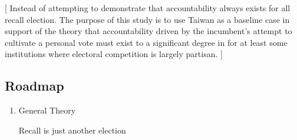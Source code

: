 \documentclass[hyphens, crop=false]{standalone}
\begin{document}
	[
	Instead of attempting to demonstrate that accountability always exists for all recall election.
	The purpose of this study is to use Taiwan as a baseline case in support
	of the theory that accountability driven by the incumbent's attempt to
	cultivate a personal vote must exist to a significant degree
	in for at least some institutions where electoral competition is largely partisan.
	]
	
	
	
	
	\subsection*{Roadmap}
	\begin{enumerate}
		\item 
		General Theory
		
		Recall is just another election
		

\end{enumerate}
\end{document}
